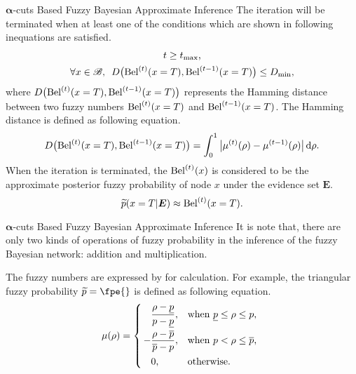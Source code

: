 \begin{frame}{$\bm{\alpha}$-cuts Based Fuzzy Bayesian Approximate Inference}
    The iteration will be terminated when at least one of the conditions which are shown in following inequations are satisfied.
    \begin{gather*}
        t \geq t_{\max}\text{,}\\
        \forall x \in \mathscr{B},\hspace{0.5em} D\big({\rm Bel}^{(t)}{(x = T)},{\rm Bel}^{(t-1)}{(x = T)}\big) \leq D_{\min}\text{,}
    \end{gather*}\pause
    where $D\big({\rm Bel}^{(t)}{(x = T)},{\rm Bel}^{(t-1)}{(x = T)}\big)$ represents the Hamming distance between two fuzzy numbers ${\rm Bel}^{(t)}{(x = T)}$ and ${\rm Bel}^{(t-1)}{(x = T)}$. The Hamming distance is defined as following equation.
    \[
        D\big({\rm Bel}^{(t)}{(x = T)},{\rm Bel}^{(t-1)}{(x = T)}\big)=\int _{0}^{1}{\big|\mu^{(t)}{(\rho)}-\mu^{(t-1)}{(\rho)}\big|}\dif \rho \text{.}
    \]\pause
    When the iteration is terminated, the ${\rm Bel}^{(t)}{(x)}$ is considered to be the approximate posterior fuzzy probability of node $x$ under the evidence set $\bm{E}$.
    \[
        \widetilde{p}{}(x = T|\bm{E}) \approx {\rm Bel}^{(t)}{(x = T)} \text{.}
    \]
\end{frame}

\begin{frame}{$\bm{\alpha}$-cuts Based Fuzzy Bayesian Approximate Inference}
    It is note that, there are only two kinds of operations of fuzzy probability in the inference of the fuzzy Bayesian network: addition and multiplication.\pause

    The fuzzy numbers are expressed by \acuts for calculation. For example, the triangular fuzzy probability $\fp{p}=\fpe{}$ is defined as following equation.
    \[
    \mu{(\rho)}=
    \left\{\begin{array}{@{\,}l@{}ll}
      & \dfrac{\rho-\pl{p}}{p - \pl{p}}, & \text{when $\pl{p} \leq \rho \leq p$,}\\[10pt]
    - & \dfrac{\rho-\pu{p}}{\pu{p} - p}, & \text{when $p < \rho \leq \pu{p}$,}\\[10pt]
      & 0,                               & \text{otherwise}.
    \end{array}\right.
    \]
\end{frame}

